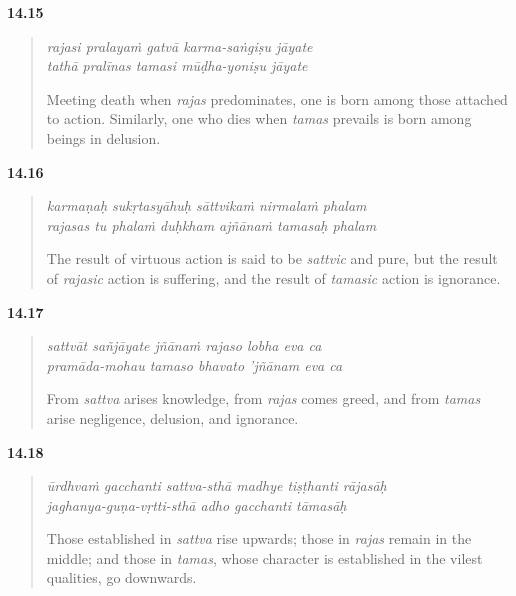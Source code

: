 \par\noindent\textbf{14.15}\par
\begin{verse}
\textit{rajasi pralayaṁ gatvā karma-saṅgiṣu jāyate} \\
\textit{tathā pralīnas tamasi mūḍha-yoniṣu jāyate}

\noindent Meeting death when \textit{rajas} predominates, one is born among those attached to action. Similarly, one who dies when \textit{tamas} prevails is born among beings in delusion.
\end{verse}
\par



\par\noindent\textbf{14.16}\par
\begin{verse}
\textit{karmaṇaḥ sukṛtasyāhuḥ sāttvikaṁ nirmalaṁ phalam} \\
\textit{rajasas tu phalaṁ duḥkham ajñānaṁ tamasaḥ phalam}

\noindent The result of virtuous action is said to be \textit{sattvic} and pure, but the result of \textit{rajasic} action is suffering, and the result of \textit{tamasic} action is ignorance.
\end{verse}
\par



\par\noindent\textbf{14.17}\par
\begin{verse}
\textit{sattvāt sañjāyate jñānaṁ rajaso lobha eva ca} \\
\textit{pramāda-mohau tamaso bhavato ’jñānam eva ca}

\noindent From \textit{sattva} arises knowledge, from \textit{rajas} comes greed, and from \textit{tamas} arise negligence, delusion, and ignorance.
\end{verse}
\par



\par\noindent\textbf{14.18}\par
\begin{verse}
\textit{ūrdhvaṁ gacchanti sattva-sthā madhye tiṣṭhanti rājasāḥ} \\
\textit{jaghanya-guṇa-vṛtti-sthā adho gacchanti tāmasāḥ}

\noindent Those established in \textit{sattva} rise upwards; those in \textit{rajas} remain in the middle; and those in \textit{tamas}, whose character is established in the vilest qualities, go downwards.
\end{verse}
\par


